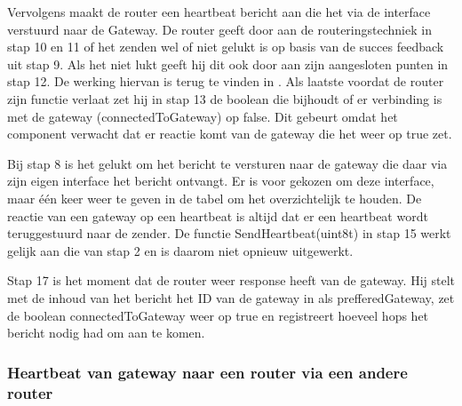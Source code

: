 \documentclass[a4paper, 11pt, oneside]{report}
\begin{document}
Vervolgens maakt de router een heartbeat bericht aan die het via de  interface verstuurd naar de Gateway.
De router geeft door aan de routeringstechniek in stap 10 en 11 of het zenden wel of niet gelukt is op basis van de succes feedback uit stap 9.
Als het niet lukt geeft hij dit ook door aan zijn aangesloten punten in stap 12. 
De werking hiervan is terug te vinden in .
Als laatste voordat de router zijn functie verlaat zet hij in stap 13 de boolean die bijhoudt of er verbinding is met de gateway (connectedToGateway) op false. Dit gebeurt omdat het component verwacht dat er reactie komt van de gateway die het weer op true zet.

Bij stap 8 is het gelukt om het bericht te versturen naar de gateway die daar via zijn eigen  interface het bericht ontvangt.
Er is voor gekozen om deze interface, maar één keer weer te geven in de tabel om het overzichtelijk te houden.
De reactie van een gateway op een heartbeat is altijd dat er een heartbeat wordt teruggestuurd naar de zender. 
De functie SendHeartbeat(uint8\textunderscore t) in stap 15 werkt gelijk aan die van stap 2 en is daarom niet opnieuw uitgewerkt.

Stap 17 is het moment dat de router weer response heeft van de gateway.
Hij stelt met de inhoud van het bericht het ID van de gateway in als prefferedGateway, zet de boolean connectedToGateway weer op true en registreert hoeveel hops het bericht nodig had om aan te komen.

\subsubsection{Heartbeat van gateway naar een router via een andere router}
\label{DetailedDesign:Communicatie:sequence:heartbeatgateway->router->router}
\end{document}
